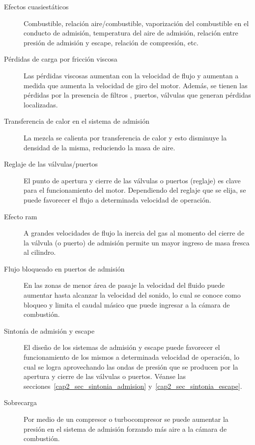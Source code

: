 \begin{description}
    \item [Efectos cuasiestáticos] Combustible, relación aire/combustible,
vaporización del combustible en el conducto de admisión, temperatura del aire de
admisión, relación entre presión de admisión y escape, relación de compresión,
etc.
  \item [Pérdidas de carga por fricción viscosa] Las pérdidas viscosas aumentan
con la velocidad de flujo y aumentan a medida que aumenta la velocidad de giro
del motor.
Además, se tienen las pérdidas por la presencia de filtros , puertos, válvulas
que generan pérdidas localizadas.
  \item [Transferencia de calor en el sistema de admisión] La mezcla se calienta
por transferencia de calor y esto disminuye la densidad de la misma, reduciendo
la masa de aire.
  \item [Reglaje de las válvulas/puertos] El punto de apertura y cierre de las
válvulas o  puertos (reglaje) es clave para el funcionamiento del motor.
Dependiendo del reglaje que se elija, se puede favorecer el flujo a determinada
velocidad de operación.
    \item [Efecto ram] A grandes velocidades de flujo la inercia del gas al
momento del cierre de la válvula (o puerto) de admisión permite un mayor ingreso
de masa fresca al cilindro.
    \item [Flujo bloqueado en puertos de admisión] En las zonas de
menor área de pasaje la velocidad del fluido puede aumentar hasta alcanzar la
velocidad del sonido, lo cual se conoce como bloqueo y limita el caudal másico que
puede ingresar a la cámara de combustión.
    \item [Sintonía de admisión y escape] El diseño de los sistemas de
admisión y escape puede favorecer el funcionamiento de los mismos a determinada
velocidad de operación, lo cual se logra aprovechando las ondas de presión que
se producen por la apertura y cierre de las válvulas o puertos.
Véanse las secciones~\ref{cap2_sec_sintonia_admision} y~\ref{cap2_sec_sintonia_escape}.
  \item [Sobrecarga] Por medio de un compresor o turbocompresor se puede
aumentar la presión en el sistema de admisión forzando más aire a la cámara de
combustión.
\end{description}

